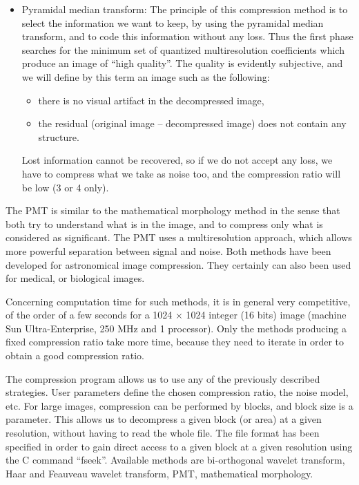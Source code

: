 \begin{itemize}
\item{Pyramidal median transform: }
The principle of this compression method is to select the 
information we want to keep,
by using the pyramidal median transform, and to code this information without
 any loss. Thus
the first phase searches for the minimum set of quantized multiresolution
coefficients which produce an image of ``high quality''. The quality is
evidently subjective, and we will define by this term an image such as 
the following:
\begin{itemize}
\baselineskip=0.4truecm
\item there is no visual artifact in the decompressed image,
\item the residual (original image -- decompressed image) does not
contain any structure.
\end{itemize}
Lost information cannot be recovered, so if we do not accept any loss,
we have to compress what we take as 
noise too, and the compression ratio will be low (3 or 4 only).
\end{itemize}

The PMT is similar to the mathematical morphology method in the sense that
both try to understand what is in the image, and to compress only what is
considered as significant. The PMT uses a multiresolution approach, which
allows more powerful separation between signal and noise. Both methods have
been developed for astronomical image compression. They certainly can also
been used for medical, or biological images.
 

Concerning computation time for 
such methods, it is in general very competitive,
of the order of a few seconds for a 1024 $\times$ 
1024 integer (16 bits) image 
(machine Sun Ultra-Enterprise, 250 MHz and 1 processor). Only the methods 
producing a fixed compression ratio take more time, because they need to 
iterate in order to obtain a good compression ratio.

The \proj compression program allows us to use any of the previously 
described strategies. User parameters define the chosen compression ratio, 
the noise model, etc. For 
large images, compression can be performed by blocks, and block size is a 
parameter. This allows us to decompress a given block (or area) at a given 
resolution, without having to read the whole file. The file format has been 
specified in order to gain  direct access to a given block at a given 
resolution using the C command ``fseek''. Available methods are 
bi-orthogonal wavelet transform, Haar and Feauveau wavelet transform,
PMT, mathematical morphology. 
 
